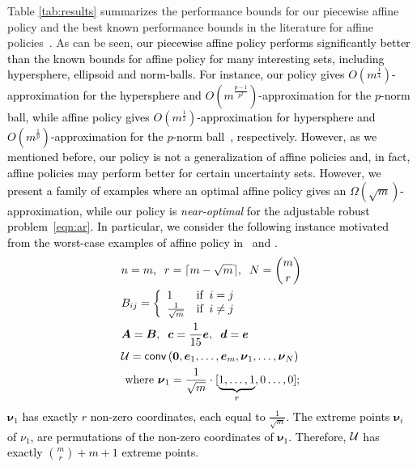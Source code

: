 \documentclass[11pt]{article}
\theoremstyle{plain}
\theoremstyle{definition}
\numberwithin{equation}{section}%
\numberwithin{equation}{section}%
\newcommand{\mb}[1]{\ensuremath{\boldsymbol{#1}}}
\newcommand*{\red}{\textcolor{black}}
\begin{document}
Table \ref{tab:results} summarizes the performance bounds for our piecewise affine policy and the best known performance bounds in the literature for affine policies~\cite{BB15}.  As can be seen, \red{our piecewise affine policy performs significantly better than the known bounds for affine policy for many interesting sets, including hypersphere, ellipsoid and norm-balls. For instance, our policy gives $ O ( m^{\frac{1}{4}})$-approximation for the hypersphere and   $O(m^{\frac{p-1}{p^2}})$-approximation for the $p$-norm ball, while affine policy gives $O(m^{\frac{1}{2}})$-approximation for hypersphere and $ O(m^{\frac{1}{p}})$-approximation for the $p$-norm ball~\cite{BB15}, respectively. However, as we mentioned before, our policy is not a generalization of affine policies and, in fact, affine policies may perform better for certain uncertainty sets.  However, we present a family of examples where an optimal affine policy gives an $\Omega (\sqrt{m}) $-approximation, while our policy is \emph{near-optimal} for the adjustable robust problem~\eqref{eqn:ar}. In particular, we consider the following instance motivated from the worst-case examples of affine policy in~\cite{BG10} and \cite{housni2017beyond}.
\begin{equation} \label{ex:bad}
\begin{aligned}
&n=m, \; \;   r= \lceil m- \sqrt{m} \rceil ,\; \;  N= \binom m r \\
&     {B}_{ij}= \left\{
    \begin{array}{ll}
        1 & \mbox{if} \; \; i=j \\
          \frac{1}{\sqrt{m}} 		& \mbox{if}  \; \;   i \neq j \\
    \end{array}
\right.\\
& \mb A= \mb B, \; \;  \mb c=\frac{1}{15}\mb e, \; \;  \mb d = \mb e \\
&{\cal U} = {\sf{conv}} \left( \mb 0, \mb e_1 , \ldots ,\mb e_m, \mb \nu_1, \ldots, \mb \nu_N \right) \\
&\text{        where   } \mb \nu_1 =  \frac{1}{\sqrt{m}} \cdot [ \underbrace{1,\ldots,1}_r ,0\ldots,0 ] ;
 \end{aligned}
\end{equation}
$ \mb \nu_1$ has exactly $r$  non-zero coordinates, each equal to $\frac{1}{\sqrt{m}}$. The extreme points $\mb \nu_i$ of $\nu_1$, are permutations of the non-zero coordinates of $\mb \nu_{1}$.  Therefore, ${\cal U}$ has exactly $ \binom m r  +m+1$ extreme points.}
\end{document}
